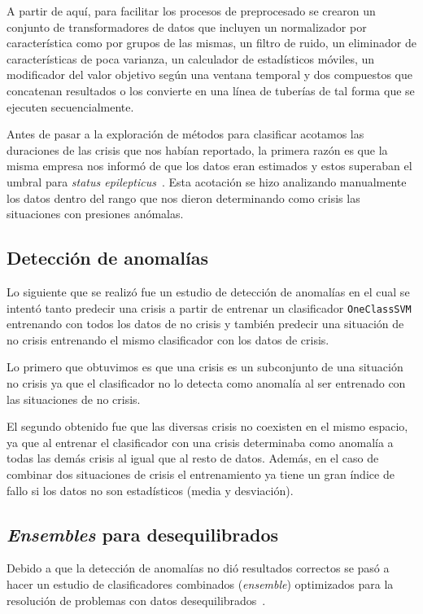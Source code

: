 A partir de aquí, para facilitar los procesos de preprocesado se crearon un conjunto de transformadores de datos que incluyen un normalizador por característica como por grupos de las mismas, un filtro de ruido, un eliminador de características de poca varianza, un calculador de estadísticos móviles, un modificador del valor objetivo según una ventana temporal y dos compuestos que concatenan resultados o los convierte en una línea de tuberías de tal forma que se ejecuten secuencialmente.

Antes de pasar a la exploración de métodos para clasificar acotamos las duraciones de las crisis que nos habían reportado, la primera razón es que la misma empresa nos informó de que los datos eran estimados y estos superaban el umbral para \textit{status epilepticus}~\cite{epilepsia}. Esta acotación se hizo analizando manualmente los datos dentro del rango que nos dieron determinando como crisis las situaciones con presiones anómalas. 

\subsection{Detección de anomalías}
Lo siguiente que se realizó fue un estudio de detección de anomalías en el cual se intentó tanto predecir una crisis a partir de entrenar un clasificador \texttt{OneClassSVM} entrenando con todos los datos de no crisis y también predecir una situación de no crisis entrenando el mismo clasificador con los datos de crisis.

Lo primero que obtuvimos es que una crisis es un subconjunto de una situación no crisis ya que el clasificador no lo detecta como anomalía al ser entrenado con las situaciones de no crisis.

El segundo obtenido fue que las diversas crisis no coexisten en el mismo espacio, ya que al entrenar el clasificador con una crisis determinaba como anomalía a todas las demás crisis al igual que al resto de datos. Además, en el caso de combinar dos situaciones de crisis el entrenamiento ya tiene un gran índice de fallo si los datos no son estadísticos (media y desviación).

\subsection{\textit{Ensembles} para desequilibrados}
Debido a que la detección de anomalías no dió resultados correctos se pasó a hacer un estudio de clasificadores combinados (\textit{ensemble}) optimizados para la resolución de problemas con datos desequilibrados~\cite{diez2015diversity,galar2012review}.

